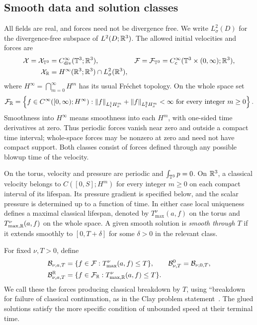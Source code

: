 \subsection{Smooth data and solution classes}
All fields are real, and forces need not be divergence free. We write
$L^2_\sigma(D)$ for the divergence-free subspace of $L^2(D;\mathbb R^3)$.
The allowed initial velocities and forces are
\begin{align}
 \mathcal X=\mathcal X_{\mathbb T^3}&=C^\infty_{\mathrm{div}}(\mathbb T^3;\mathbb R^3),&
 \mathcal F=\mathcal F_{\mathbb T^3}&=C_c^\infty(\mathbb T^3\times(0,\infty);\mathbb R^3),
 \label{eq:inputspaces}\\
 \mathcal X_{\mathbb R}&=H^\infty(\mathbb R^3;\mathbb R^3)\cap L^2_\sigma(\mathbb R^3),
 \label{eq:Rinitial}
\end{align}
where $H^\infty=\bigcap_{m=0}^\infty H^m$ has its usual Fr\'echet topology.
On the whole space set
\begin{equation}\label{eq:Rclasses}
 \mathcal F_{\mathbb R}=\left\{f\in C^\infty([0,\infty);H^\infty):
 \left\lVert f\right\rVert_{L^1_tH^m_x}+\left\lVert f\right\rVert_{L^2_tH^m_x}<\infty
 \text{ for every integer }m\ge0\right\}.
\end{equation}
Smoothness into $H^\infty$ means smoothness into each $H^m$, with
one-sided time derivatives at zero. Thus periodic forces vanish near zero
and outside a compact time interval; whole-space forces may be nonzero at
zero and need not have compact support. Both classes consist of forces
defined through any possible blowup time of the velocity.

On the torus, velocity and pressure are periodic and $\int_{\mathbb T^3}p=0$.
On $\mathbb R^3$, a classical velocity belongs to $C([0,S];H^m)$ for every
integer $m\ge0$ on each compact interval of its lifespan. Its pressure
gradient is specified below, and the scalar pressure is determined up to
a function of time. In either case local uniqueness defines a maximal
classical lifespan, denoted by $T^\nu_{\max}(a,f)$ on the torus and
$T^\nu_{\max,\mathbb R}(a,f)$ on the whole space. A given smooth solution is
\emph{smooth through $T$} if it extends smoothly to $[0,T+\delta]$
for some $\delta>0$ in the relevant class.

For fixed $\nu,T>0$, define
\begin{align}
 \mathcal B_{\nu,a,T}&=\{f\in\mathcal F:T^\nu_{\max}(a,f)\le T\},&
 \mathcal B^0_{\nu,T}&=\mathcal B_{\nu,0,T},\label{eq:singularforces}\\
 \mathcal B^\mathbb R_{\nu,a,T}
 &=\{f\in\mathcal F_{\mathbb R}:T^\nu_{\max,\mathbb R}(a,f)\le T\}.
 \label{eq:Rsingularforces}
\end{align}
We call these the forces producing classical breakdown by $T$, using
``breakdown for failure of classical continuation, as in the Clay
problem statement~\cite[alternatives (C) and (D)]{clay}.
The glued solutions satisfy the more specific condition of unbounded
speed at their terminal time.


